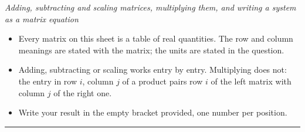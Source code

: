 \documentclass[12pt]{article}
\begin{document}

\begin{center}
\small\textit{Adding, subtracting and scaling matrices, multiplying them, and writing a system as a matrix equation}
\end{center}

\begin{itemize}[leftmargin=0.7cm, itemsep=1pt, topsep=2pt]
  \item Every matrix on this sheet is a table of real quantities. The row and column meanings are stated with the matrix; the units are stated in the question.
  \item Adding, subtracting or scaling works entry by entry. Multiplying does not: the entry in row $i$, column $j$ of a product pairs row $i$ of the left matrix with column $j$ of the right one.
  \item Write your result in the empty bracket provided, one number per position.
\end{itemize}

\vspace{0.1cm}
\noindent\rule{\linewidth}{0.4pt}

\end{document}
